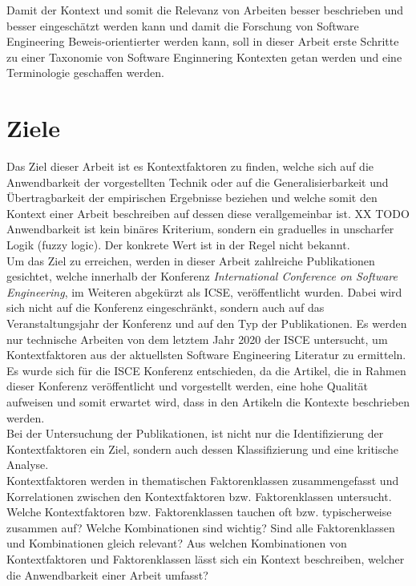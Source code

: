 Damit der Kontext und somit die Relevanz von Arbeiten besser beschrieben und besser eingeschätzt werden kann und damit die Forschung von Software Engineering Beweis-orientierter werden kann, soll in dieser Arbeit erste Schritte zu einer Taxonomie von Software Enginnering Kontexten getan werden und eine Terminologie geschaffen werden.

\section{Ziele}
Das Ziel dieser Arbeit ist es Kontextfaktoren zu finden, welche sich auf die Anwendbarkeit der vorgestellten Technik oder auf die Generalisierbarkeit und Übertragbarkeit der empirischen Ergebnisse beziehen und welche somit den Kontext einer Arbeit beschreiben auf dessen diese verallgemeinbar ist.
XX TODO Anwendbarkeit ist kein binäres Kriterium, sondern ein graduelles in unscharfer Logik (fuzzy logic). Der konkrete Wert ist in der Regel nicht bekannt. \\

Um das Ziel zu erreichen, werden in dieser Arbeit zahlreiche Publikationen gesichtet, welche innerhalb der Konferenz \textit{International Conference on Software Engineering}, im Weiteren abgekürzt als ICSE, veröffentlicht wurden. Dabei wird sich nicht auf die Konferenz eingeschränkt, sondern auch auf das Veranstaltungsjahr der Konferenz und auf den Typ der Publikationen. Es werden nur technische Arbeiten von dem letztem Jahr 2020 der ISCE untersucht, um Kontextfaktoren aus der aktuellsten Software Engineering Literatur zu ermitteln. Es wurde sich für die ISCE Konferenz entschieden, da die Artikel, die in Rahmen dieser Konferenz veröffentlicht und vorgestellt werden, eine hohe Qualität aufweisen und somit erwartet wird, dass in den Artikeln die Kontexte beschrieben werden. \\

Bei der Untersuchung der Publikationen, ist nicht nur die Identifizierung der Kontextfaktoren ein Ziel, sondern auch dessen Klassifizierung und eine kritische Analyse. \\
Kontextfaktoren werden in thematischen Faktorenklassen zusammengefasst und Korrelationen zwischen den Kontextfaktoren bzw. Faktorenklassen untersucht. \\
Welche Kontextfaktoren bzw. Faktorenklassen tauchen oft bzw. typischerweise zusammen auf? Welche Kombinationen sind wichtig? Sind alle Faktorenklassen und Kombinationen gleich relevant? Aus welchen Kombinationen von Kontextfaktoren und Faktorenklassen lässt sich ein Kontext beschreiben, welcher die Anwendbarkeit einer Arbeit umfasst? \\

